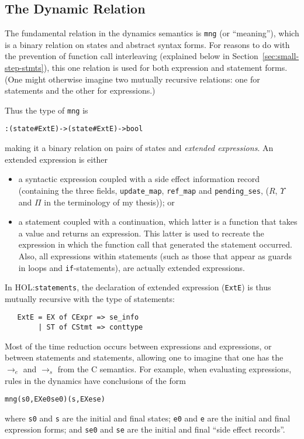 \documentclass[11pt]{article}
\newcommand{\HOLfile}[1]{HOL:\texttt{#1}}
\begin{document}
\subsection{The Dynamic Relation}

\newcommand{\mng}{\texttt{mng}}

The fundamental relation in the dynamics semantics is \mng{} (or
``meaning''), which is a binary relation on states and abstract syntax
forms.  For reasons to do with the prevention of function call
interleaving (explained below in Section~\ref{sec:small-step-stmts}),
this one relation is used for both expression and statement forms.
(One might otherwise imagine two mutually recursive relations: one for
statements and the other for expressions.)

Thus the type of \mng{} is
\begin{alltt}
   : (state # ExtE) -> (state # ExtE) -> bool
\end{alltt}
making it a binary relation on pairs of states and \emph{extended
  expressions}.  An extended expression is either
\begin{itemize}
\item a syntactic expression coupled with a side effect information
  record (containing the three fields, \texttt{update\_map},
  \texttt{ref\_map} and \texttt{pending\_ses}, ($R$, $\Upsilon$ and
  $\Pi$ in the terminology of my thesis)); or
\item a statement coupled with a continuation, which latter is a
  function that takes a value and returns an expression.  This latter
  is used to recreate the expression in which the function call
  that generated the statement occurred.  Also, all expressions within
  statements (such as those that appear as guards in loops and
  \texttt{if}-statements), are actually extended expressions.
\end{itemize}

In \HOLfile{statements}, the declaration of extended expression
(\texttt{ExtE}) is thus mutually recursive with the type of
statements:
\begin{verbatim}
   ExtE = EX of CExpr => se_info
        | ST of CStmt => conttype
\end{verbatim}

Most of the time reduction occurs between expressions and expressions,
or between statements and statements, allowing one to imagine that one
has the $\rightarrow_e$ and $\rightarrow_s$ from the C semantics.
For example, when evaluating expressions, rules in the dynamics have
conclusions of the form
\begin{alltt}
   mng (s0, EX e0 se0) (s, EX e se)
\end{alltt}
where \texttt{s0} and \texttt{s} are the initial and final states;
\texttt{e0} and \texttt{e} are the initial and final expression forms;
and \texttt{se0} and \texttt{se} are the initial and final ``side
effect records''.
\end{document}
